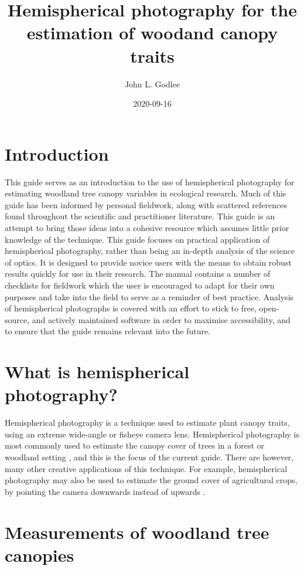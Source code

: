 \documentclass{article}
\title{Hemispherical photography for the estimation of woodand canopy traits}
\date{2020-09-16}
\author{John L. Godlee}
\begin{document}
\maketitle

\tableofcontents
\newpage

\section{Introduction}

This guide serves as an introduction to the use of hemispherical photography for estimating woodland tree canopy variables in ecological research. Much of this guide has been informed by personal fieldwork, along with scattered references found throughout the scientific and practitioner literature. This guide is an attempt to bring those ideas into a cohesive resource which assumes little prior knowledge of the technique. This guide focuses on practical application of hemispherical photography, rather than being an in-depth analysis of the science of optics. It is designed to provide novice users with the means to obtain robust results quickly for use in their research. The manual contains a number of checklists for fieldwork which the user is encouraged to adapt for their own purposes and take into the field to serve as a reminder of best practice. Analysis of hemispherical photographs is covered with an effort to stick to free, open-source, and actively maintained software in order to maximise accessibility, and to ensure that the guide remains relevant into the future.

\section{What is hemispherical photography?}

Hemispherical photography is a technique used to estimate plant canopy traits, using an extreme wide-angle or fisheye camera lens. Hemispherical photography is most commonly used to estimate the canopy cover of trees in a forest or woodland setting \citep{Seidel2011, Macfarlane2014}, and this is the focus of the current guide. There are however, many other creative applications of this technique. For example, hemispherical photography may also be used to estimate the ground cover of agricultural crops, by pointing the camera downwards instead of upwards \citep{Demarez2008}.

\section{Measurements of woodland tree canopies}
\end{document}
